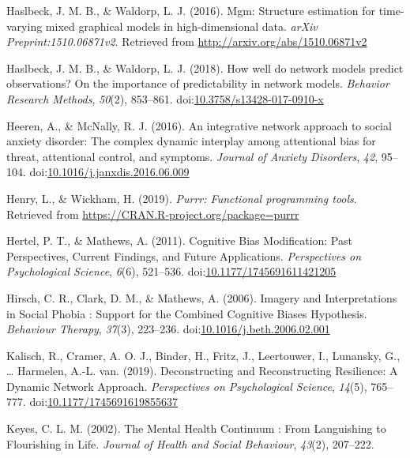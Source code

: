 \documentclass[man,floatsintext]{apa6}
\begin{document}
\leavevmode\hypertarget{ref-R-mgm}{}%
Haslbeck, J. M. B., \& Waldorp, L. J. (2016). Mgm: Structure estimation for time-varying mixed graphical models in high-dimensional data. \emph{arXiv Preprint:1510.06871v2}. Retrieved from \url{http://arxiv.org/abs/1510.06871v2}

\leavevmode\hypertarget{ref-haslbeck_how_2018}{}%
Haslbeck, J. M. B., \& Waldorp, L. J. (2018). How well do network models predict observations? On the importance of predictability in network models. \emph{Behavior Research Methods}, \emph{50}(2), 853--861. doi:\href{https://doi.org/10.3758/s13428-017-0910-x}{10.3758/s13428-017-0910-x}

\leavevmode\hypertarget{ref-Heeren2016}{}%
Heeren, A., \& McNally, R. J. (2016). An integrative network approach to social anxiety disorder: The complex dynamic interplay among attentional bias for threat, attentional control, and symptoms. \emph{Journal of Anxiety Disorders}, \emph{42}, 95--104. doi:\href{https://doi.org/10.1016/j.janxdis.2016.06.009}{10.1016/j.janxdis.2016.06.009}

\leavevmode\hypertarget{ref-R-purrr}{}%
Henry, L., \& Wickham, H. (2019). \emph{Purrr: Functional programming tools}. Retrieved from \url{https://CRAN.R-project.org/package=purrr}

\leavevmode\hypertarget{ref-Hertel2011}{}%
Hertel, P. T., \& Mathews, A. (2011). Cognitive Bias Modification: Past Perspectives, Current Findings, and Future Applications. \emph{Perspectives on Psychological Science}, \emph{6}(6), 521--536. doi:\href{https://doi.org/10.1177/1745691611421205}{10.1177/1745691611421205}

\leavevmode\hypertarget{ref-Hirsch2006}{}%
Hirsch, C. R., Clark, D. M., \& Mathews, A. (2006). Imagery and Interpretations in Social Phobia : Support for the Combined Cognitive Biases Hypothesis. \emph{Behaviour Therapy}, \emph{37}(3), 223--236. doi:\href{https://doi.org/10.1016/j.beth.2006.02.001}{10.1016/j.beth.2006.02.001}

\leavevmode\hypertarget{ref-kalisch_deconstructing_2019}{}%
Kalisch, R., Cramer, A. O. J., Binder, H., Fritz, J., Leertouwer, I., Lunansky, G., \ldots{} Harmelen, A.-L. van. (2019). Deconstructing and Reconstructing Resilience: A Dynamic Network Approach. \emph{Perspectives on Psychological Science}, \emph{14}(5), 765--777. doi:\href{https://doi.org/10.1177/1745691619855637}{10.1177/1745691619855637}

\leavevmode\hypertarget{ref-Keyes2002}{}%
Keyes, C. L. M. (2002). The Mental Health Continuum : From Languishing to Flourishing in Life. \emph{Journal of Health and Social Behaviour}, \emph{43}(2), 207--222.
\end{document}
